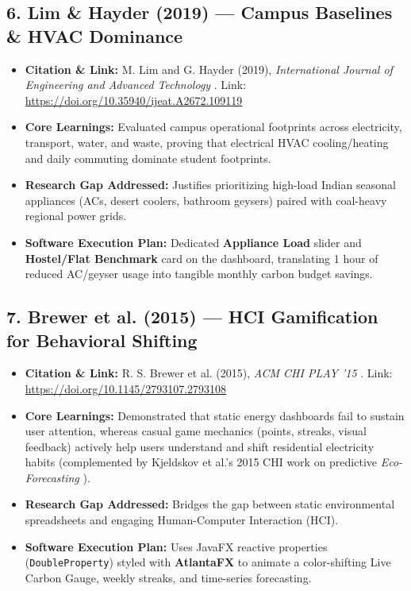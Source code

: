 \documentclass[12pt, a4paper]{article}
\begin{document}
\subsection{6. Lim \& Hayder (2019) --- Campus Baselines \& HVAC Dominance}
\begin{itemize}[leftmargin=*]
    \item \textbf{Citation \& Link:} M. Lim and G. Hayder (2019), \textit{International Journal of Engineering and Advanced Technology} \cite{lim2019performance}. Link: \href{https://doi.org/10.35940/ijeat.A2672.109119}{https://doi.org/10.35940/ijeat.A2672.109119}
    \item \textbf{Core Learnings:} Evaluated campus operational footprints across electricity, transport, water, and waste, proving that electrical HVAC cooling/heating and daily commuting dominate student footprints.
    \item \textbf{Research Gap Addressed:} Justifies prioritizing high-load Indian seasonal appliances (ACs, desert coolers, bathroom geysers) paired with coal-heavy regional power grids.
    \item \textbf{Software Execution Plan:} Dedicated \textbf{Appliance Load} slider and \textbf{Hostel/Flat Benchmark} card on the dashboard, translating 1 hour of reduced AC/geyser usage into tangible monthly carbon budget savings.
\end{itemize}

\subsection{7. Brewer et al. (2015) --- HCI Gamification for Behavioral Shifting}
\begin{itemize}[leftmargin=*]
    \item \textbf{Citation \& Link:} R. S. Brewer et al. (2015), \textit{ACM CHI PLAY '15} \cite{brewer2015tough}. Link: \href{https://doi.org/10.1145/2793107.2793108}{https://doi.org/10.1145/2793107.2793108}
    \item \textbf{Core Learnings:} Demonstrated that static energy dashboards fail to sustain user attention, whereas casual game mechanics (points, streaks, visual feedback) actively help users understand and shift residential electricity habits (complemented by Kjeldskov et al.'s 2015 CHI work on predictive \textit{Eco-Forecasting} \cite{kjeldskov2015ecoforecasting}).
    \item \textbf{Research Gap Addressed:} Bridges the gap between static environmental spreadsheets and engaging Human-Computer Interaction (HCI).
    \item \textbf{Software Execution Plan:} Uses JavaFX reactive properties (\texttt{DoubleProperty}) styled with \textbf{AtlantaFX} to animate a color-shifting Live Carbon Gauge, weekly streaks, and time-series forecasting.
\end{itemize}
\end{document}
